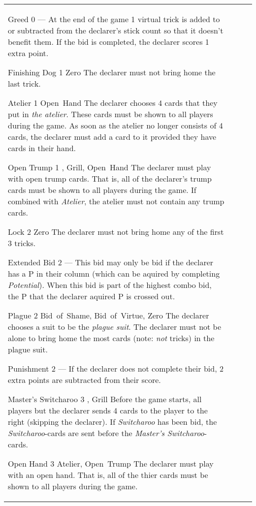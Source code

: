 \begin{table}
\begin{center}
\begin{tabularx}{\textwidth}{
			l
			S[table-number-alignment=center, table-figures-decimal=0]
			p{3cm}
			|X
		}
			\specialBidItem%
			{Greed}
			{0}
			{---}
			{%
				At the end of the game 1 virtual trick is added to or subtracted from the declarer's stick count so that it doesn't benefit them. If the bid is completed, the declarer scores 1 extra point.
			}

			\specialBidItem%
			{Finishing Dog}
			{1}
			{Zero}
			{%
				The declarer must not bring home the last trick.
			}

			\specialBidItem%
			{Atelier}
			{1}
			{Open~Hand}
			{%
				The declarer chooses 4 cards that they put in \emph{the atelier}. These cards must be shown to all players during the game. As soon as the atelier no longer consists of 4 cards, the declarer must add a card to it provided they have cards in their hand.
			}

			\specialBidItem%
			{Open Trump}
			{1}
			{\nonTrump, Grill, Open~Hand}
			{%
				The declarer must play with open trump cards. That is, all of the declarer’s trump cards must be shown to all players during the game. If combined with \emph{Atelier}, the atelier must not contain any trump cards.
			}

			\specialBidItem%
			{Lock}
			{2}
			{Zero}
			{%
				The declarer must not bring home any of the first 3 tricks.
			}

			\specialBidItem%
			{Extended Bid}
			{2}
			{---}
			{%
				This bid may only be bid if the declarer has a P in their column (which can be aquired by completing \emph{Potential}). When this bid is part of the highest combo bid, the P that the declarer aquired P is crossed out.
			}

			\specialBidItem%
			{Plague}
			{2}
			{Bid~of~Shame, Bid~of~Virtue, Zero}
			{%
				The declarer chooses a suit to be the \emph{plague suit}. The declarer must not be alone to bring home the most cards (note: \emph{not} tricks) in the plague suit.
			}

			\specialBidItem%
			{Punishment}
			{2}
			{---}
			{%
				If the declarer does not complete their bid, 2 extra points are subtracted from their score.
			}

			\specialBidItem%
			{Master's Switcharoo}
			{3}
			{\nonTrump, Grill}
			{%
				Before the game starts, all players but the declarer sends 4 cards to the player to the right (skipping the declarer). If \emph{Switcharoo} has been bid, the \emph{Switcharoo}-cards are sent before the \emph{Master's Switcharoo}-cards.
			}

			\specialBidItem%
			{Open Hand}
			{3}
			{Atelier, Open~Trump}
			{%
				The declarer must play with an open hand. That is, all of the thier cards must be shown to all players during the game.
			}
		\end{tabularx}
	\end{center}
\end{table}
